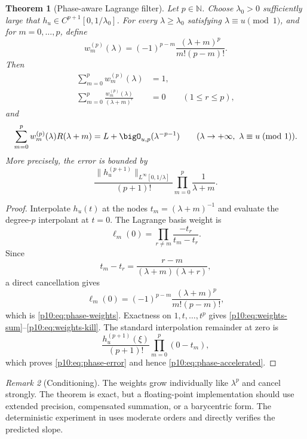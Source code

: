 \documentclass[11pt]{article}
\numberwithin{equation}{section}
\newtheorem{theorem}{Theorem}[section]
\theoremstyle{definition}
\theoremstyle{remark}
\newtheorem{remark}[theorem]{Remark}
\newcommand{\N}{\mathbb N}
\begin{document}
\begin{theorem}[Phase-aware Lagrange filter]
\label{p10:thm:phase-lagrange}
Let $p\in\N$.  Choose $\lambda_0>0$ sufficiently large that
$h_u\in C^{p+1}[0,1/\lambda_0]$.  For every $\lambda\ge\lambda_0$ satisfying
$\lambda\equiv u\pmod1$, and for $m=0,\ldots,p$, define
\begin{equation}
 w_m^{(p)}(\lambda)
 =(-1)^{p-m}\frac{(\lambda+m)^p}{m!(p-m)!}.                  \label{p10:eq:phase-weights}
\end{equation}
Then
\begin{align}
 \sum_{m=0}^{p}w_m^{(p)}(\lambda)&=1,                       \label{p10:eq:weights-sum}\\
 \sum_{m=0}^{p}\frac{w_m^{(p)}(\lambda)}{(\lambda+m)^r}&=0
 \qquad(1\le r\le p),                                      \label{p10:eq:weights-kill}
\end{align}
and
\begin{equation}
 \sum_{m=0}^{p}w_m^{(p)}(\lambda)R(\lambda+m)
 =L+\bigO_{u,p}(\lambda^{-p-1})
 \qquad(\lambda\to+\infty,\ \lambda\equiv u\!\pmod1).    \label{p10:eq:phase-accelerated}
\end{equation}
More precisely, the error is bounded by
\begin{equation}
 \frac{\|h_u^{(p+1)}\|_{L^\infty[0,1/\lambda]}}{(p+1)!}
 \prod_{m=0}^{p}\frac{1}{\lambda+m}.                        \label{p10:eq:phase-error}
\end{equation}
\end{theorem}

\begin{proof}
Interpolate $h_u(t)$ at the nodes
$t_m=(\lambda+m)^{-1}$ and evaluate the degree-$p$ interpolant at $t=0$.  The Lagrange basis
weight is
\[
 \ell_m(0)=\prod_{r\ne m}\frac{-t_r}{t_m-t_r}.
\]
Since
\[
 t_m-t_r=\frac{r-m}{(\lambda+m)(\lambda+r)},
\]
a direct cancellation gives
\[
 \ell_m(0)
 =(-1)^{p-m}\frac{(\lambda+m)^p}{m!(p-m)!},
\]
which is \eqref{p10:eq:phase-weights}.  Exactness on $1,t,\ldots,t^p$ gives
\eqref{p10:eq:weights-sum}--\eqref{p10:eq:weights-kill}.  The standard interpolation remainder at
zero is
\[
 \frac{h_u^{(p+1)}(\xi)}{(p+1)!}\prod_{m=0}^{p}(0-t_m),
\]
which proves \eqref{p10:eq:phase-error} and hence \eqref{p10:eq:phase-accelerated}.
\end{proof}

\begin{remark}[Conditioning]
The weights grow individually like $\lambda^p$ and cancel strongly.  The theorem is exact,
but a floating-point implementation should use extended precision, compensated summation,
or a barycentric form.  The deterministic experiment in  uses moderate
orders and directly verifies the predicted slope.
\end{remark}
\end{document}
